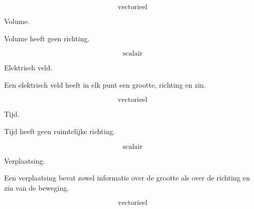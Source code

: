 \documentclass{ximera}
\begin{document}
\begin{oefening}{\oefB\ESS}
\begin{question}
\begin{oplossing}
\[
\boxed{\text{vectorieel}}
\]
\end{oplossing}
\end{question}


\begin{question}
Volume.

\begin{oplossing}
Volume heeft geen richting.

\[
\boxed{\text{scalair}}
\]
\end{oplossing}
\end{question}


\begin{question}
Elektrisch veld.

\begin{oplossing}
Een elektrisch veld heeft in elk punt een grootte, richting en zin.

\[
\boxed{\text{vectorieel}}
\]
\end{oplossing}
\end{question}


\begin{question}
Tijd.

\begin{oplossing}
Tijd heeft geen ruimtelijke richting.

\[
\boxed{\text{scalair}}
\]
\end{oplossing}
\end{question}


\begin{question}
Verplaatsing.

\begin{oplossing}
Een verplaatsing bevat zowel informatie over de grootte als over de richting
en zin van de beweging.

\[
\boxed{\text{vectorieel}}
\]
\end{oplossing}
\end{question}

\end{oefening}
\end{document}
